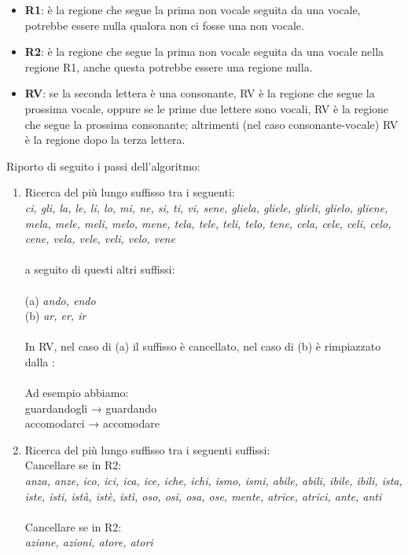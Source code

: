 \documentclass{article}
\theoremstyle{plain}
\theoremstyle{definition}
\begin{document}
\begin{itemize}
\item \textbf{R1}: è la regione che segue la prima non vocale seguita da una vocale, potrebbe essere nulla qualora non ci fosse una non vocale.
\item \textbf{R2}: è la regione che segue la prima non vocale seguita da una vocale nella regione R1, anche questa potrebbe essere una regione nulla.
\item \textbf{RV}: se la seconda lettera è una consonante, RV è la regione che segue la prossima vocale, oppure se le prime due lettere sono vocali, RV è la regione che segue la prossima consonante; altrimenti (nel caso consonante-vocale) RV è la regione dopo la terza lettera.
\end{itemize}
Riporto di seguito i passi dell'algoritmo:
\begin{enumerate}
\item Ricerca del più lungo suffisso tra i seguenti:
\\
\textit{ci, gli, la, le, li, lo, mi, ne, si, ti, vi, sene, gliela, gliele, glieli, glielo, gliene, mela, mele, meli, melo, mene, tela, tele, teli, telo, tene, cela, cele, celi, celo, cene, vela, vele, veli, velo, vene}
\\
\\
a seguito di questi altri suffissi:
\\
\\
(a) \textit{ando, endo}
\\
(b) \textit{ar, er, ir}
\\
\\
In RV, nel caso di (a) il suffisso è cancellato, nel caso di (b) è rimpiazzato dalla :
\\
\\
Ad esempio abbiamo:
\\
guardandogli → guardando
\\
accomodarci → accomodare
\\
\item Ricerca del più lungo suffisso tra i seguenti suffissi:
\\
Cancellare se in R2:
\\
\textit{anza, anze, ico, ici, ica, ice, iche, ichi, ismo, ismi, abile, abili, ibile, ibili, ista, iste, isti, istà,  istè, istì, oso, osi, osa, ose, mente, atrice, atrici, ante, anti}
\\
\\
Cancellare se in R2:
\\
\textit{azione, azioni, atore, atori} 

\end{enumerate}
\end{document}
